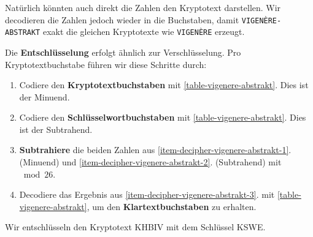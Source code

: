 \begin{hinweis}
Natürlich könnten auch direkt die Zahlen den Kryptotext darstellen. Wir decodieren die Zahlen jedoch wieder in die Buchstaben, damit \texttt{VIGENÈRE-ABSTRAKT} exakt die gleichen Kryptotexte wie \texttt{VIGENÈRE} erzeugt.
\end{hinweis}

Die \textbf{Entschlüsselung} erfolgt ähnlich zur Verschlüsselung. Pro Kryptotextbuchstabe führen wir diese Schritte durch:

\begin{enumerate}
	\item \label{item-decipher-vigenere-abstrakt-1} Codiere den \textbf{Kryptotextbuchstaben} mit \autoref{table-vigenere-abstrakt}. Dies ist der Minuend.
	\item \label{item-decipher-vigenere-abstrakt-2} Codiere den \textbf{Schlüsselwortbuchstaben} mit \autoref{table-vigenere-abstrakt}. Dies ist der Subtrahend.
	\item \label{item-decipher-vigenere-abstrakt-3} \textbf{Subtrahiere} die beiden Zahlen aus \ref{item-decipher-vigenere-abstrakt-1}. (Minuend) und \ref{item-decipher-vigenere-abstrakt-2}. (Subtrahend) mit $\bmod 26$.
	\item Decodiere das Ergebnis aus \ref{item-decipher-vigenere-abstrakt-3}. mit \autoref{table-vigenere-abstrakt}, um den \textbf{Klartextbuchstaben} zu erhalten.
\end{enumerate}

\newpage

\begin{example}
Wir entschlüsseln den Kryptotext KHBIV mit dem Schlüssel KSWE.

\begin{table}[htb]
\end{table}
\end{example}


